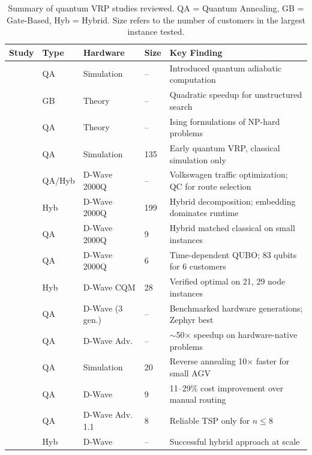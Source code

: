 \documentclass[preprint,3p,12pt,authoryear]{elsarticle}
\begin{document}
\begin{table}[h!]
\centering
\caption{\color{red}Summary of quantum VRP studies reviewed. QA = Quantum Annealing, GB = Gate-Based, Hyb = Hybrid. Size refers to the number of customers in the largest instance tested.}
\label{tab:lit-summary}
\scriptsize
\color{red}
\begin{tabular}{p{3.2cm}p{1.2cm}p{2.0cm}p{1.0cm}p{4.5cm}}
\toprule
\textbf{Study} & \textbf{Type} & \textbf{Hardware} & \textbf{Size} & \textbf{Key Finding} \\
\midrule
\citet{farhi2000quantum} & QA & Simulation & -- & Introduced quantum adiabatic computation \\
\citet{grover1996quantum} & GB & Theory & -- & Quadratic speedup for unstructured search \\
\citet{lucas2014ising} & QA & Theory & -- & Ising formulations of NP-hard problems \\
\citet{crispin2013quantum} & QA & Simulation & 135 & Early quantum VRP, classical simulation only \\
\citet{neukart2017traffic} & QA/Hyb & D-Wave 2000Q & -- & Volkswagen traffic optimization; QC for route selection \\
\citet{feld2019hybrid} & Hyb & D-Wave 2000Q & 199 & Hybrid decomposition; embedding dominates runtime \\
\citet{borowski2020new} & QA & D-Wave 2000Q & 9 & Hybrid matched classical on small instances \\
\citet{irie2019quantum} & QA & D-Wave 2000Q & 6 & Time-dependent QUBO; 83 qubits for 6 customers \\
\citet{osaba2024solving} & Hyb & D-Wave CQM & 28 & Verified optimal on 21, 29 node instances \\
\citet{pelofske2025comparing} & QA & D-Wave (3 gen.) & -- & Benchmarked hardware generations; Zephyr best \\
\citet{tasseff2024emerging} & QA & D-Wave Adv. & -- & $\sim$50$\times$ speedup on hardware-native problems \\
\citet{haba2022travel} & QA & Simulation & 20 & Reverse annealing 10$\times$ faster for small AGV \\
\citet{tambunan2023quantum} & QA & D-Wave & 9 & 11--29\% cost improvement over manual routing \\
\citet{jain2021solving} & QA & D-Wave Adv. 1.1 & 8 & Reliable TSP only for $n \leq 8$ \\
\citet{kim2025quantum} & Hyb & D-Wave & -- & Successful hybrid approach at scale \\

\end{tabular}
\end{table}
\end{document}
